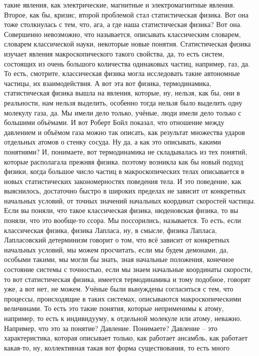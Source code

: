 такие явления, как электрические, магнитные и электромагнитные явления. Второе,
как бы, кризис, второй проблемой стал статистическая физика. Вот она тоже
столкнулась с тем, что, ага, а где наша статистическая физика? Вот она.
Совершенно невозможно, что называется, описывать классическим словарем, словарем
классической науки, некоторые новые понятия. Статистическая физика изучает
явления макроскопического такого свойства, да, то есть систем, состоящих из
очень большого количества одинаковых частиц, например, газ, да. То есть,
смотрите, классическая физика могла исследовать такие автономные частицы, их
взаимодействия. А вот эта вот физика, термодинамика, статистическая физика вышла
на явления, которые, ну, нельзя, как бы, они в реальности, нам нельзя выделить,
особенно тогда нельзя было выделить одну молекулу газа, да. Мы имели дело
только, учёные, люди имели дело только с большими объёмами. И вот Роберт Бойл
показал, что отношение между давлением и объёмом газа можно так описать, как
результат множества ударов отдельных атомов о стенку сосуда. Ну да, а как это
описывать, какими понятиями? И, понимаете, вот термодинамика не складывалась из
тех понятий, которые располагала прежняя физика. поэтому возникла как бы новый
подход физики, когда большое число частиц в макроскопических телах описывается в
новых статистических закономерностях поведения тела. И это поведение, как
выяснилось, достаточно быстро в широких пределах не зависит от конкретных
начальных условий, от точных значений начальных координат скоростей частицы.
Если вы поняли, что такое классическая физика, нюденовская физика, то вы поняли,
что это вообще-то ссора. Мы поссорились, называется. То есть, если классическая
физика, физика Лапласа, ну, в смысле, физика Лапласа, Лапласовский детерминизм
говорит о том, что всё зависит от конкретных начальных условий, мы можем
просчитать, если мы будем демонами, да, особыми такими, мы могли бы знать, зная
начальные положения, конечное состояние системы с точностью, если мы знаем
начальные координаты скорости, то вот статистическая физика, имеется
термодинамика и тому подобное, говорят уже, а вот нет, не можем. Учёные были
вынуждены согласиться с тем, что процессы, происходящие в таких системах,
описываются макроскопическими величинами. То есть это такие понятия, которые
неприменимы к атому, например, то есть к индивидууму, к отдельной молекуле или
атому, неважно. Например, что это за понятие? Давление. Понимаете? Давление –
это характеристика, которая описывает только, как работает ансамбль, как
работает какая-то, ну, коллективная такая вот форма существования, то есть много
